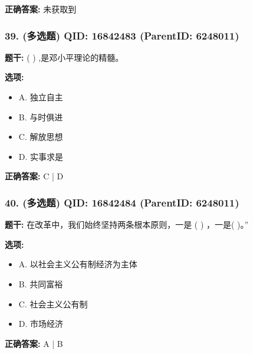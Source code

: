 \documentclass[12pt,UTF8]{ctexart}
\begin{document}
\textbf{正确答案:}
未获取到

\vspace{0.3em}\hrulefill\vspace{0.7em}

\subsubsection*{39. (多选题) \small QID: 16842483 (ParentID: 6248011)}

\textbf{题干:}
( ) ,是邓小平理论的精髓。



\textbf{选项:}
\begin{itemize}[leftmargin=*]

  \item A. 独立自主

  \item B. 与时俱进

  \item C. 解放思想

  \item D. 实事求是

\end{itemize}

\textbf{正确答案:}
C | D

\vspace{0.3em}\hrulefill\vspace{0.7em}

\subsubsection*{40. (多选题) \small QID: 16842484 (ParentID: 6248011)}

\textbf{题干:}
在改革中，我们始终坚持两条根本原则，一是 ( ) ，一是( )。”



\textbf{选项:}
\begin{itemize}[leftmargin=*]

  \item A. 以社会主义公有制经济为主体

  \item B. 共同富裕

  \item C. 社会主义公有制

  \item D. 市场经济

\end{itemize}

\textbf{正确答案:}
A | B
\end{document}
